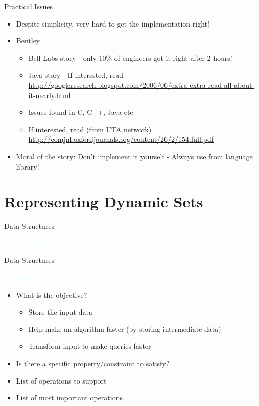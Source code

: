 \documentclass{beamer}
\newcommand{\tblue}[1]{{\Large {\textcolor{azure}{#1}}}}
\begin{document}
\begin{frame}{Practical Issues}
\begin{itemize}
\item Despite simplicity, very hard to get the implementation right! 
\item Bentley
\begin{itemize}
    \item Bell Labs story - only 10\% of engineers got it right after 2 hours! 
    \item Java story - If interested, read \url{http://googleresearch.blogspot.com/2006/06/extra-extra-read-all-about-it-nearly.html}
    \item Issues found in C, C++, Java etc
    \item If interested, read (from UTA network) \url{http://comjnl.oxfordjournals.org/content/26/2/154.full.pdf} 
\end{itemize}
\item Moral of the story: Don't implement it yourself - Always use from language library!
\end{itemize}
\end{frame}


\section{Representing Dynamic Sets}

\begin{frame}{Data Structures}
\begin{center}
    {\Huge {\textcolor{azure}{Data Structures}}}
\end{center}
\end{frame}


\begin{frame}{Data Structures}

\tblue{Key Points:}
\begin{itemize}
\item What is the objective? 
\begin{itemize}
    \item Store the input data
    \item Help make an algorithm faster (by storing intermediate data)
    \item Transform input to make queries faster
\end{itemize}
\item Is there a specific property/constraint to satisfy?
\item List of operations to support
\item List of most important operations
\end{itemize}
\end{frame}
\end{document}
